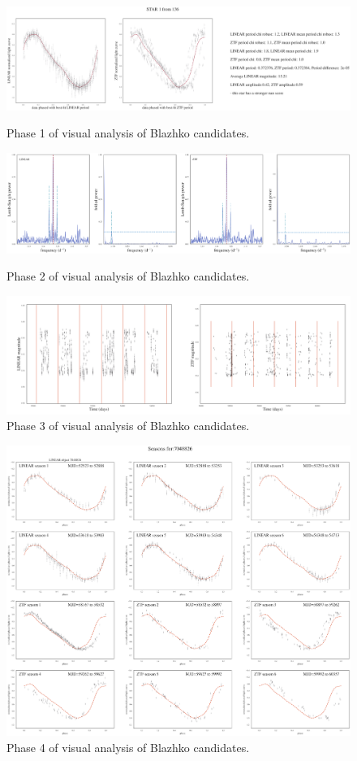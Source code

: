 \documentclass{aa}
\begin{document}
\begin{figure}[ht]
  \centering
  \includegraphics[width=17cm]{LCplot_7048826.png}
       \caption{Phase 1 of visual analysis of Blazhko candidates.}
       \label{fig:phase1}
  \includegraphics[width=17cm]{periodogram7048826.png}
    \caption{Phase 2 of visual analysis of Blazhko candidates.}
    \label{fig:phase2}

    \centering
       \includegraphics[width=17cm]{season_plot7048826.png}
         \caption{Phase 3 of visual analysis of Blazhko candidates.}
         \label{fig:phase3}
\end{figure}
\begin{figure}[ht]
    \centering
    \includegraphics[width=17cm]{LCplotBySeason7048826.png}
      \caption{Phase 4 of visual analysis of Blazhko candidates.}
      \label{fig:phase4}
\end{figure}
\end{document}
